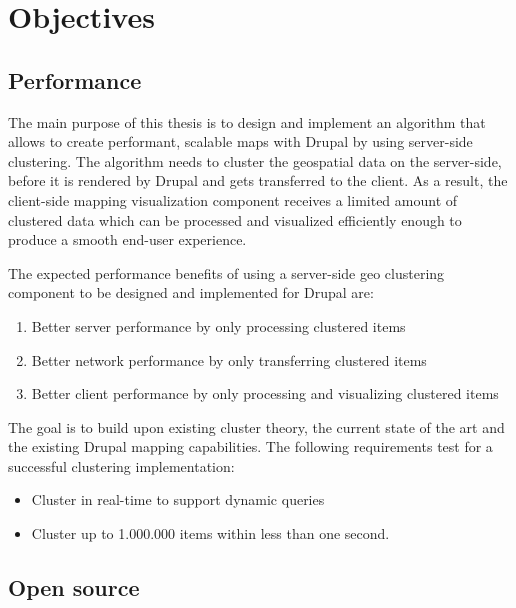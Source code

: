 
%
%

\chapter{Objectives}
\label{chapter:objectives}


\section{Performance}

The main purpose of this thesis is to design and implement an algorithm that allows to create performant, scalable maps with Drupal by using server-side clustering. The algorithm needs to cluster the geospatial data on the server-side, before it is rendered by Drupal and gets transferred to the client. As a result, the client-side mapping visualization component receives a limited amount of clustered data which can be processed and visualized efficiently enough to produce a smooth end-user experience.

The expected performance benefits of using a server-side geo clustering component to be designed and implemented for Drupal are:

\begin{enumerate}

\item Better server performance by only processing clustered items
\item Better network performance by only transferring clustered items 
\item Better client performance by only processing and visualizing clustered items 

\end{enumerate}

The goal is to build upon existing cluster theory, the current state of the art and the existing Drupal mapping capabilities. The following requirements test for a successful clustering implementation:

\begin{itemize}

\item Cluster in real-time to support dynamic queries
\item Cluster up to 1.000.000 items within less than one second.

\end{itemize}


\section{Open source}

